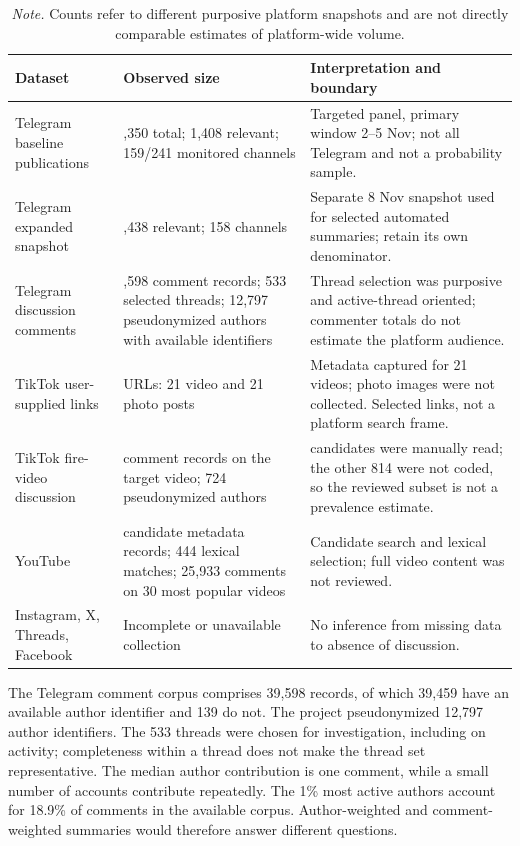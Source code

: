 \begin{table}[!t]
\centering
\small
\caption{Observed datasets and what their denominators mean.}
\begin{tabularx}{\textwidth}{>{\raggedright\arraybackslash}p{}>{\raggedright\arraybackslash}p{}>{\raggedright\arraybackslash}X}
\toprule
\bfseries Dataset & \bfseries Observed size & \bfseries Interpretation and boundary \\
\midrule
Telegram baseline publications & 23,350 total; 1,408 relevant; 159/241 monitored channels & Targeted panel, primary window 2--5 Nov; not all Telegram and not a probability sample. \\
Telegram expanded snapshot & 1,438 relevant; 158 channels & Separate 8 Nov snapshot used for selected automated summaries; retain its own denominator. \\
Telegram discussion comments & 39,598 comment records; 533 selected threads; 12,797 pseudonymized authors with available identifiers & Thread selection was purposive and active-thread oriented; commenter totals do not estimate the platform audience. \\
TikTok user-supplied links & 42 URLs: 21 video and 21 photo posts & Metadata captured for 21 videos; photo images were not collected. Selected links, not a platform search frame. \\
TikTok fire-video discussion & 883 comment records on the target video; 724 pseudonymized authors & 69 candidates were manually read; the other 814 were not coded, so the reviewed subset is not a prevalence estimate. \\
YouTube & 617 candidate metadata records; 444 lexical matches; 25,933 comments on 30 most popular videos & Candidate search and lexical selection; full video content was not reviewed. \\
Instagram, X, Threads, Facebook & Incomplete or unavailable collection & No inference from missing data to absence of discussion. \\
\bottomrule
\end{tabularx}
\caption*{\small\textit{Note.} Counts refer to different purposive platform snapshots and are not directly comparable estimates of platform-wide volume.}
\end{table}

The Telegram comment corpus comprises 39,598 records, of which 39,459 have an available author identifier and 139 do not. The project pseudonymized 12,797 author identifiers. The 533 threads were chosen for investigation, including on activity; completeness within a thread does not make the thread set representative. The median author contribution is one comment, while a small number of accounts contribute repeatedly. The 1\% most active authors account for 18.9\% of comments in the available corpus. Author-weighted and comment-weighted summaries would therefore answer different questions.

